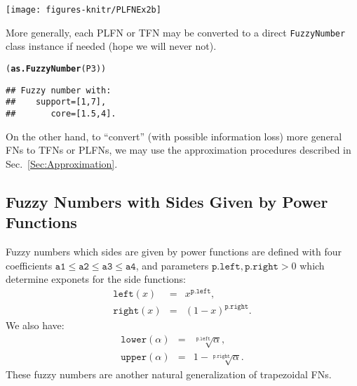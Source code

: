 \documentclass[11pt]{article}\usepackage{graphicx, color}
\makeatletter
\newcommand{\hlfunctioncall}[1]{\textcolor[rgb]{0.501960784313725,0,0.329411764705882}{\textbf{#1}}}%
\newenvironment{kframe}{%
 \def\at@end@of@kframe{}%
 \ifinner\ifhmode%
  \def\at@end@of@kframe{\end{minipage}}%
  \begin{minipage}{\columnwidth}%
 \fi\fi%
 \def\FrameCommand##1{\hskip\@totalleftmargin \hskip-\fboxsep
 \colorbox{shadecolor}{##1}\hskip-\fboxsep
     \hskip-\linewidth \hskip-\@totalleftmargin \hskip\columnwidth}%
 \MakeFramed {\advance\hsize-\width
   \@totalleftmargin\z@ \linewidth\hsize
   \@setminipage}}%
 {\par\unskip\endMakeFramed%
 \at@end@of@kframe}
\newenvironment{knitrout}{}{} %
\makeatother
\begin{document}
\begin{center}
\begin{knitrout}\small
{}\color{fgcolor}

{\centering \texttt{[image: figures-knitr/PLFNEx2b]} 

}



\end{knitrout}

\end{center}

\noindent
More generally, each PLFN or TFN may be converted
to a direct \texttt{FuzzyNumber} class instance if needed
(hope we will never not).

\begin{knitrout}\small
{}\color{fgcolor}\begin{kframe}
\begin{alltt}
(\hlfunctioncall{as.FuzzyNumber}(P3))
\end{alltt}
\begin{verbatim}
## Fuzzy number with:
##    support=[1,7],
##       core=[1.5,4].
\end{verbatim}
\end{kframe}
\end{knitrout}


On the other hand, to ``convert'' (with possible information loss)
more general FNs to TFNs or PLFNs, we may use the approximation
procedures described in Sec.~\ref{Sec:Approximation}.



\subsection{Fuzzy Numbers with Sides Given by Power Functions}\label{Sec:powerdef}

Fuzzy numbers which sides are given by power functions
are defined with four coefficients $\mathtt{a1}\le\mathtt{a2}\le\mathtt{a3}\le\mathtt{a4}$,
and parameters $\mathtt{p.left},\mathtt{p.right}>0$ which determine
exponets for the side functions:
\begin{eqnarray}
\mathtt{left}(x)&=&x^{\mathtt{p.left}},\\
\mathtt{right}(x)&=&(1-x)^{\mathtt{p.right}}.
\end{eqnarray}
We also have:
\begin{eqnarray}
\mathtt{lower}(\alpha)&=&\sqrt[\mathtt{p.left}]{\alpha},\\
\mathtt{upper}(\alpha)&=&1-\sqrt[\mathtt{p.right}]{\alpha}.
\end{eqnarray}
These fuzzy numbers are another natural generalization of trapezoidal FNs.
\end{document}
